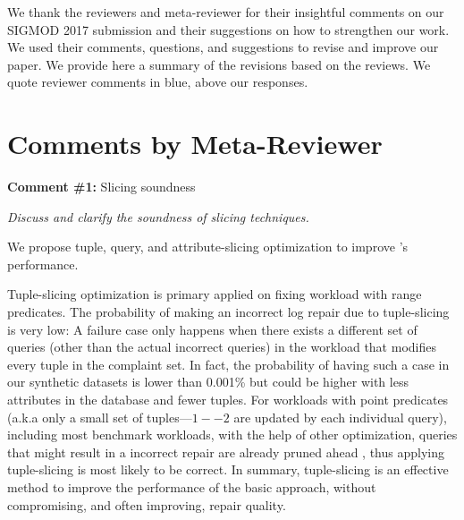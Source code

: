 


\newcommand{\reviewer}[1]{\itshape{{\color{commentColor} #1}}}
\newcommand{\comskip}{\bigskip}


\renewenvironment{quote}
{\vspace{-1mm}\list{}{\rightmargin=0cm \leftmargin=0cm}%
\item\relax}
{\endlist}

We thank the reviewers and meta-reviewer for their insightful comments on our
SIGMOD 2017 submission and their suggestions on how to strengthen our work. We
used their comments, questions, and suggestions to revise and improve our
paper. We provide here a summary of the revisions based on the reviews. We
quote reviewer comments in blue, above our responses.

\section*{Comments by Meta-Reviewer}

\noindent
\textbf{Comment \#1:} Slicing soundness
\begin{quote}
\reviewer{
Discuss and clarify the soundness of slicing techniques.
}
\end{quote}

We propose tuple, query, and attribute-slicing optimization to improve \sys's
performance.

Tuple-slicing optimization is primary applied on fixing workload with range
predicates. The probability of making an incorrect log repair due to
tuple-slicing is very low: A failure case only happens when there exists a
different set of queries (other than the actual incorrect queries) in the
workload that modifies every tuple in the complaint set. In fact, the
probability of having such a case in our synthetic datasets is lower than
0.001\% but could be higher with less attributes in the database and fewer
tuples. For workloads with point predicates (a.k.a only a small set of
tuples---$1--2$ are updated by each individual query), including most benchmark
workloads, with the help of other optimization, queries that might result in a
incorrect repair are already pruned ahead , thus applying tuple-slicing is
most likely to be correct. In summary, tuple-slicing is an effective method to
improve the performance of the basic approach, without compromising, and often
improving, repair quality.

